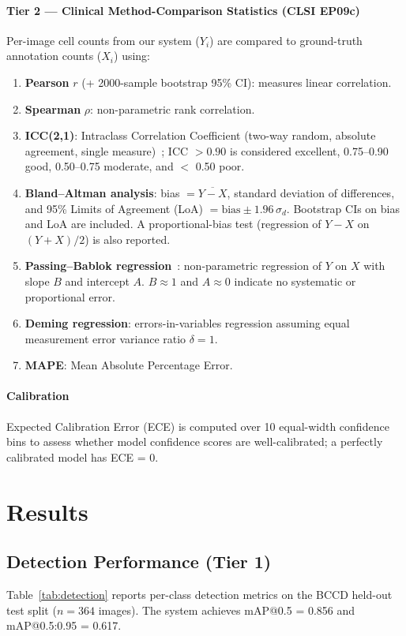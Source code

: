 \documentclass[10pt,conference]{IEEEtran}
\newcommand{\nBCCD}{364}
\newcommand{\mAPBCCD}{0.856}
\newcommand{\mAPfullBCCD}{0.617}
\begin{document}
\paragraph{Tier 2 — Clinical Method-Comparison Statistics (CLSI EP09c)}
Per-image cell counts from our system ($Y_i$) are compared to ground-truth annotation counts ($X_i$) using:
\begin{enumerate}
  \item \textbf{Pearson} $r$ (+ 2000-sample bootstrap 95\% CI): measures linear correlation.
  \item \textbf{Spearman} $\rho$: non-parametric rank correlation.
  \item \textbf{ICC(2,1)}: Intraclass Correlation Coefficient (two-way random, absolute agreement, single measure)~\cite{koo2016}; ICC $> 0.90$ is considered excellent, 0.75–0.90 good, 0.50–0.75 moderate, and $<$ 0.50 poor.
  \item \textbf{Bland--Altman analysis}: bias $= \overline{Y - X}$, standard deviation of differences, and 95\% Limits of Agreement (LoA) $= \text{bias} \pm 1.96\,\sigma_d$. Bootstrap CIs on bias and LoA are included. A proportional-bias test (regression of $Y - X$ on $(Y+X)/2$) is also reported.
  \item \textbf{Passing--Bablok regression}~\cite{passing1983}: non-parametric regression of $Y$ on $X$ with slope $B$ and intercept $A$. $B \approx 1$ and $A \approx 0$ indicate no systematic or proportional error.
  \item \textbf{Deming regression}: errors-in-variables regression assuming equal measurement error variance ratio $\delta = 1$.
  \item \textbf{MAPE}: Mean Absolute Percentage Error.
\end{enumerate}

\paragraph{Calibration}
Expected Calibration Error (ECE) is computed over 10 equal-width confidence bins to assess whether model confidence scores are well-calibrated; a perfectly calibrated model has ECE = 0.

\section{Results}
\label{sec:results}

\subsection{Detection Performance (Tier 1)}
Table~\ref{tab:detection} reports per-class detection metrics on the BCCD held-out test split ($n = \nBCCD{}$ images). The system achieves mAP@0.5 = \mAPBCCD{} and mAP@0.5:0.95 = \mAPfullBCCD{}.
\end{document}
